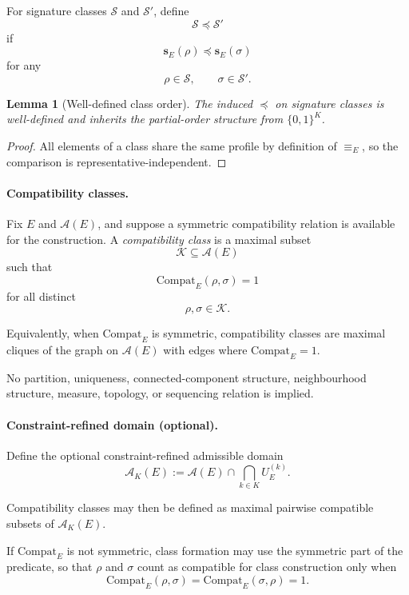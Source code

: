 \documentclass[aps,prx,onecolumn,11pt]{revtex4-2}
\theoremstyle{plain}
\newtheorem{lemma}{Lemma}
\theoremstyle{definition}
\theoremstyle{remark}
\begin{document}
For signature classes \(\mathcal{S}\) and \(\mathcal{S}'\), define
\[
\mathcal{S}\preceq\mathcal{S}'
\]
if
\[
\mathbf{s}_E(\rho)\preceq\mathbf{s}_E(\sigma)
\]
for any
\[
\rho\in\mathcal{S},
\qquad
\sigma\in\mathcal{S}'.
\]

\begin{lemma}[Well-defined class order]
\label{lem:class_order_welldefined}
The induced \(\preceq\) on signature classes is well-defined and
inherits the partial-order structure from \(\{0,1\}^K\).
\end{lemma}

\begin{proof}
All elements of a class share the same profile by definition of
\(\equiv_E\), so the comparison is representative-independent.
\end{proof}

\paragraph{Compatibility classes.}

Fix \(E\) and \(\mathcal{A}(E)\), and suppose a symmetric
compatibility relation is available for the construction. A
\emph{compatibility class} is a maximal subset
\[
\mathcal{K}\subseteq\mathcal{A}(E)
\]
such that
\[
\mathrm{Compat}_E(\rho,\sigma)=1
\]
for all distinct
\[
\rho,\sigma\in\mathcal{K}.
\]

Equivalently, when \(\mathrm{Compat}_E\) is symmetric, compatibility
classes are maximal cliques of the graph on \(\mathcal{A}(E)\) with
edges where \(\mathrm{Compat}_E=1\).

No partition, uniqueness, connected-component structure,
neighbourhood structure, measure, topology, or sequencing relation is
implied.

\paragraph{Constraint-refined domain (optional).}

Define the optional constraint-refined admissible domain
\[
\mathcal{A}_K(E)
:=
\mathcal{A}(E)
\cap
\bigcap_{k\in K}U^{(k)}_E.
\]

Compatibility classes may then be defined as maximal pairwise
compatible subsets of \(\mathcal{A}_K(E)\).

If \(\mathrm{Compat}_E\) is not symmetric, class formation may use the
symmetric part of the predicate, so that \(\rho\) and \(\sigma\) count
as compatible for class construction only when
\[
\mathrm{Compat}_E(\rho,\sigma)
=
\mathrm{Compat}_E(\sigma,\rho)
=
1.
\]
\end{document}

